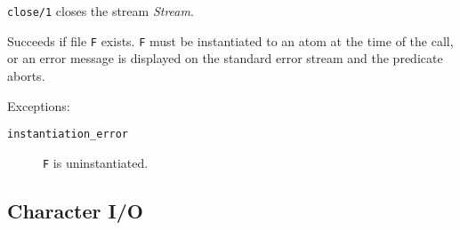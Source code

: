 \begin{description}
	{\tt close/1} closes the stream {\em Stream}.

    Succeeds if file {\tt F} exists. {\tt F} must be instantiated to
    an atom at the time of the call, or an error message is displayed on
    the standard error stream and the predicate aborts.

    Exceptions:
    \begin {description}
    \item[{\tt instantiation\_error}]
	{\tt F} is uninstantiated.
    \end{description}

\end{description}


\subsection{Character I/O}
